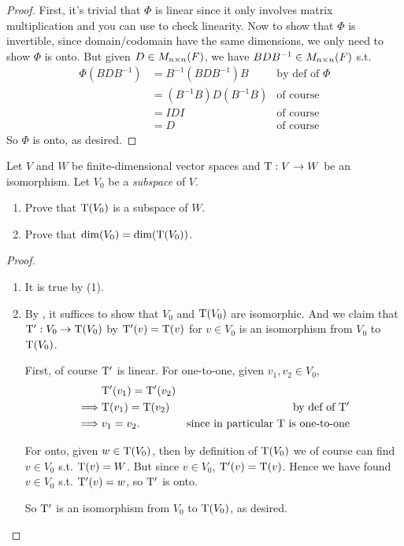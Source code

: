 \begin{proof}
First, it's trivial that \(\Phi\) is linear since it only involves matrix multiplication and you can use  to check linearity.
Now to show that \(\Phi\) is invertible, since domain/codomain have the same dimensions, we only need to show \(\Phi\) is onto.
But given \(D \in M_{n \times n}(F)\), we have \(B D B^{-1} \in M_{n \times n}(F)\) s.t.
\begin{align*}
    \Phi(B D B^{-1}) & = B^{-1} (B D B^{-1}) B & \text{by def of \(\Phi\)} \\
                     & = (B^{-1}B) D (B^{-1} B) & \text{of course} \\
                     & = IDI & \text{of course} \\
                     & = D & \text{of course}
\end{align*}
So \(\Phi\) is onto, as desired.
\end{proof}

\begin{exercise} \label{exercise 2.4.17}
Let \(V\) and \(W\) be finite-dimensional vector spaces and \(\mathrm{T} : V \to W\) be an isomorphism.
Let \(V_0\) be a \emph{subspace} of \(V\).
\begin{enumerate}
\item Prove that \(\mathrm{T}(V_0)\) is a subspace of \(W\).
\item Prove that \(\dim(V_0) = \dim(\mathrm{T}(V_0))\).
\end{enumerate}
\end{exercise}

\begin{proof} \ 

\begin{enumerate}
\item It is true by (1).
\item By , it suffices to show that \(V_0\) and \(\mathrm{T}(V_0)\) are isomorphic.
And we claim that \(\mathrm{T}' : V_0 \to \mathrm{T}(V_0)\) by \(\mathrm{T}'(v) = \mathrm{T}(v)\) for \(v \in V_0\) is an isomorphism from \(V_0\) to \(\mathrm{T}(V_0)\).

First, of course \(\mathrm{T}'\) is linear.
For one-to-one, given \(v_1, v_2 \in V_0\),
\begin{align*}
             & \mathrm{T}'(v_1) = \mathrm{T}'(v_2) \\
    \implies & \mathrm{T}(v_1) = \mathrm{T}(v_2) & \text{by def of \(\mathrm{T}'\)} \\
    \implies & v_1 = v_2. & \text{since in particular \(\mathrm{T}\) is one-to-one}
\end{align*}

For onto, given \(w \in \mathrm{T}(V_0)\), then by definition of \(\mathrm{T}(V_0)\) we of course can find \(v \in V_0\) s.t. \(\mathrm{T}(v) = W\).
But since \(v \in V_0\), \(\mathrm{T}'(v) = \mathrm{T}(v)\).
Hence we have found \(v \in V_0\) s.t. \(\mathrm{T}'(v) = w\), so \(\mathrm{T}'\) is onto.

So \(\mathrm{T}'\) is an isomorphism from \(V_0\) to \(\mathrm{T}(V_0)\), as desired.
\end{enumerate}

\end{proof}


